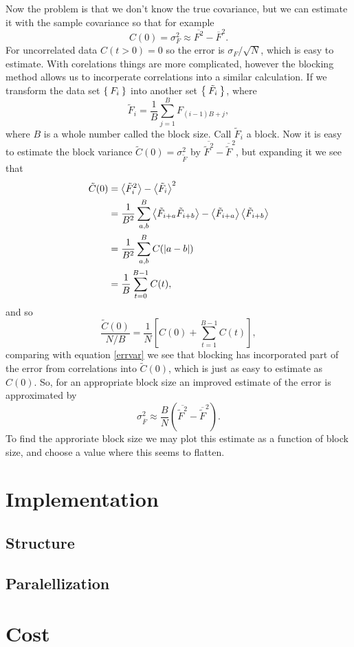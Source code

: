 \documentclass[a4paper,norsk,10pt]{article}
\newcommand{\be}{\begin{equation}}
\newcommand{\ee}{\end{equation}}
\newcommand{\f}{\frac}
\renewcommand{\bar}{\overline}
\renewcommand{\braket}{\Braket}
\begin{document}
Now the problem is that we don't know the true covariance, but we can estimate it with the sample covariance so that for example
\be
C(0) = \sigma_F^2 \approx \bar{F^2}-\bar{F}^2.
\ee
For uncorrelated data $C(t>0) = 0$ so the error is $\sigma_F/\sqrt{N}$, which is easy to estimate.
With corelations things are more complicated, however the blocking method allows us to incorperate correlations into a similar calculation.
If we transform the data set $\Set{F_i}$ into another set $\Set{\tilde{F}_i}$, where
\be
\tilde{F}_i = \f{1}{B}\sum_{j=1}^{B}F_{(i-1)B+j},\label{block}
\ee
where $B$ is a whole number called the block size. Call $\tilde{F}_i$ a block.
Now it is easy to estimate the block variance $\tilde{C}(0) = \sigma^2_{\tilde{F}}$ by $\bar{\tilde{F}^2}-\bar{\tilde{F}}^2$, but expanding it we see that
\begin{align*}
  \tilde{C}(0) &= \braket{\tilde{F}_i^2}-\braket{\tilde{F}_i}^2\\
  &= \f{1}{B^2}\sum_{a,b}^B\braket{\tilde{F}_{i+a}\tilde{F}_{i+b}}-\braket{\tilde{F}_{i+a}}\braket{\tilde{F}_{i+b}}\\
  &= \f{1}{B^2}\sum_{a,b}^BC(|a-b|)\\
  &= \f{1}{B}\sum_{t=0}^{B-1}C(t),
\end{align*}
and so
\be
\f{\tilde{C}(0)}{N/B} = \f{1}{N}\left[C(0) +\sum_{t = 1}^{B-1}C(t)\right],\label{blockvar}
\ee
comparing with equation \ref{errvar} we see that blocking has incorporated part of the error from correlations into $\tilde{C}(0)$, which is just as easy to estimate
as $C(0)$. So, for an appropriate block size an improved estimate of the error is approximated by
\be
\sigma_{\bar{F}}^2 \approx \f{B}{N}\left(\bar{\tilde{F}^2}-\bar{\tilde{F}}^2\right).\label{errest}
\ee
To find the approriate block size we may plot this estimate as a function of block size, and choose a value where this seems to flatten. 

\section{Implementation}

\subsection{Structure}
\subsection{Paralellization}

\section{Cost}
\end{document}
